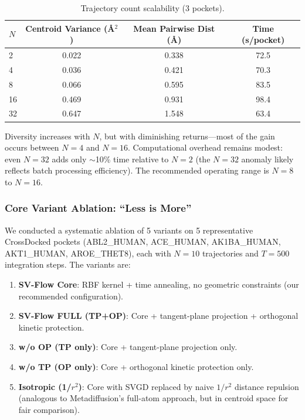 \documentclass[a4paper,11pt]{article}
\begin{document}
\begin{table}[H]
\centering
\caption{Trajectory count scalability (3 pockets).}
\label{tab:n_scalability}
\begin{tabular}{l c c c}
\toprule
$N$ & \textbf{Centroid Variance (\AA$^2$)} & \textbf{Mean Pairwise Dist (\AA)} & \textbf{Time (s/pocket)} \\
\midrule
2  & 0.022 & 0.338 & 72.5 \\
4  & 0.036 & 0.421 & 70.3 \\
8  & 0.066 & 0.595 & 83.5 \\
16 & 0.469 & 0.931 & 98.4 \\
32 & 0.647 & 1.548 & 63.4 \\
\bottomrule
\end{tabular}
\end{table}

Diversity increases with $N$, but with diminishing returns---most of the gain
occurs between $N = 4$ and $N = 16$.  Computational overhead remains modest: even
$N = 32$ adds only $\sim$10\% time relative to $N = 2$ (the $N = 32$ anomaly
likely reflects batch processing efficiency).  The recommended operating range is
$N = 8$ to $N = 16$.

\subsubsection{Core Variant Ablation: ``Less is More''}

We conducted a systematic ablation of 5 variants on 5 representative CrossDocked
pockets (ABL2\_HUMAN, ACE\_HUMAN, AK1BA\_HUMAN, AKT1\_HUMAN, AROE\_THET8), each
with $N = 10$ trajectories and $T = 500$ integration steps.  The variants are:

\begin{enumerate}
  \item \textbf{SV-Flow Core}: RBF kernel + time annealing, no geometric
    constraints (our recommended configuration).
  \item \textbf{SV-Flow FULL (TP+OP)}: Core + tangent-plane projection +
    orthogonal kinetic protection.
  \item \textbf{w/o OP (TP only)}: Core + tangent-plane projection only.
  \item \textbf{w/o TP (OP only)}: Core + orthogonal kinetic protection only.
  \item \textbf{Isotropic (1/$r^2$)}: Core with SVGD replaced by naive $1/r^2$
    distance repulsion (analogous to Metadiffusion's full-atom approach, but in
    centroid space for fair comparison).
\end{enumerate}
\end{document}
